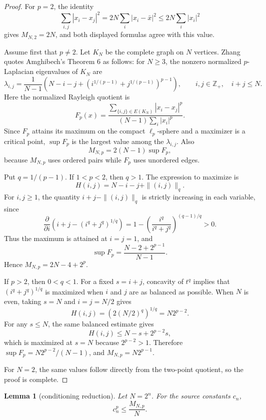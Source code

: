 \documentclass[11pt]{article}
\newtheorem{lemma}{Lemma}
\begin{document}
\begin{proof}
For \(p=2\), the identity
\[
\sum_{i,j}|x_i-x_j|^2=2N\sum_i|x_i-\bar x|^2\leq 2N\sum_i|x_i|^2
\]
gives \(M_{N,2}=2N\), and both displayed formulas agree with this value.

Assume first that \(p\neq2\).  Let \(K_N\) be the complete graph on \(N\)
vertices.  Zhang quotes Amghibech's Theorem 6 as follows: for \(N\geq3\), the
nonzero normalized \(p\)-Laplacian eigenvalues of \(K_N\) are
\[
 \lambda_{i,j}=
 \frac{1}{N-1}\left(
 N-i-j+\left(i^{1/(p-1)}+j^{1/(p-1)}\right)^{p-1}
 \right),
 \qquad i,j\in\mathbb Z_+,\quad i+j\leq N.
\]
Here the normalized Rayleigh quotient is
\[
 F_p(x)=
 \frac{\sum_{\{i,j\}\in E(K_N)}|x_i-x_j|^p}
 {(N-1)\sum_i |x_i|^p}.
\]
Since \(F_p\) attains its maximum on the compact \(\ell_p\)-sphere and a
maximizer is a critical point, \(\sup F_p\) is the largest value among the
\(\lambda_{i,j}\).  Also
\[
 M_{N,p}=2(N-1)\sup F_p,
\]
because \(M_{N,p}\) uses ordered pairs while \(F_p\) uses unordered edges.

Put \(q=1/(p-1)\).  If \(1<p<2\), then \(q>1\).  The expression to maximize is
\[
 H(i,j)=N-i-j+\|(i,j)\|_q.
\]
For \(i,j\geq1\), the quantity \(i+j-\|(i,j)\|_q\) is strictly increasing in
each variable, since
\[
 \frac{\partial}{\partial i}\left(i+j-(i^q+j^q)^{1/q}\right)
 =1-\left(\frac{i^q}{i^q+j^q}\right)^{(q-1)/q}>0.
\]
Thus the maximum is attained at \(i=j=1\), and
\[
\sup F_p=\frac{N-2+2^{p-1}}{N-1}.
\]
Hence \(M_{N,p}=2N-4+2^p\).

If \(p>2\), then \(0<q<1\).  For a fixed \(s=i+j\), concavity of \(t^q\)
implies that \((i^q+j^q)^{1/q}\) is maximized when \(i\) and \(j\) are as
balanced as possible.  When \(N\) is even, taking \(s=N\) and \(i=j=N/2\)
gives
\[
 H(i,j)=\left(2(N/2)^q\right)^{1/q}=N2^{p-2}.
\]
For any \(s\leq N\), the same balanced estimate gives
\[
 H(i,j)\leq N-s+2^{p-2}s,
\]
which is maximized at \(s=N\) because \(2^{p-2}>1\).  Therefore
\(\sup F_p=N2^{p-2}/(N-1)\), and \(M_{N,p}=N2^{p-1}\).

For \(N=2\), the same values follow directly from the two-point quotient, so
the proof is complete.
\end{proof}

\begin{lemma}[conditioning reduction]\label{lem:conditioning}
Let \(N=2^n\).  For the source constants \(c_n\),
\[
 c_n^p\leq \frac{M_{N,p}}{N}.
\]
\end{lemma}
\end{document}
